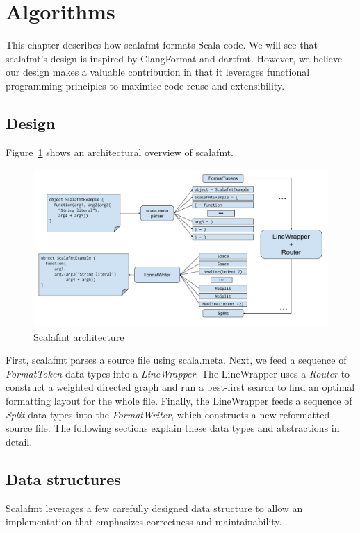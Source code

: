 \section{Algorithms}\label{sec:algorithms}
This chapter describes how scalafmt formats Scala code.
We will see that scalafmt's design is inspired by ClangFormat and dartfmt.
However, we believe our design makes a valuable contribution in that it leverages functional programming principles to maximise code reuse and extensibility.

\subsection{Design}
Figure~\ref{fig:architecture} shows an architectural overview of scalafmt.
\begin{figure}
  \centering
  \includegraphics[width=\textwidth]{img/architechture.pdf}
  \caption{Scalafmt architecture}
  \label{fig:architecture}
\end{figure}
First, scalafmt parses a source file using scala.meta.
Next, we feed a sequence of \emph{FormatToken} data types into a \emph{LineWrapper}.
The LineWrapper uses a \emph{Router} to construct a weighted directed graph and run a best-first search to find an optimal formatting layout for the whole file.
Finally, the LineWrapper feeds a sequence of \emph{Split} data types into the \emph{FormatWriter}, which constructs a new reformatted source file.
The following sections explain these data types and abstractions in detail.

\subsection{Data structures}
Scalafmt leverages a few carefully designed data structure to allow an implementation that emphasizes correctness and maintainability.

